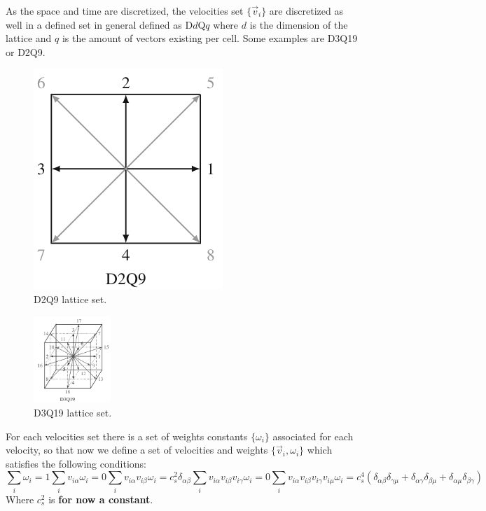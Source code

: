 As the space and time are discretized, the velocities set $\{\vec v_i\}$ are discretized as well in a defined set in general defined as D$d$Q$q$ where $d$ is the dimension of the lattice and $q$ is the amount of vectors existing per cell. Some examples are D3Q19 or D2Q9. 
\begin{figure}
\centering
\includegraphics[width=.25\textwidth]{images/LB/D2Q9.png}
\caption{\small D2Q9 lattice set.}
\end{figure}
 
\begin{figure}
\centering
\includegraphics[width=0.26\textwidth]{images/LB/D3Q19.png}
\caption{\small D3Q19 lattice set.}
\end{figure}

For each velocities set there is a set of weights constants $\{\omega_i\}$ associated for each velocity, so that now we define a set of velocities and weights $\{\vec v_i,\omega_i\}$ which satisfies the following conditions:
\begin{subequations}\label{eqs:sums_vw}
\begin{equation}\label{eq:sum_wi}
    \sum_i \omega_i = 1
\end{equation}
\begin{equation}\label{eq:sum_viwi}
    \sum_i v_{i\alpha}\omega_i = 0
\end{equation}
\begin{equation}\label{eq:sum_viviwi}
    \sum_i v_{i\alpha}v_{i\beta}\omega_i = c_s^2\delta_{\alpha\beta}
\end{equation}
\begin{equation}\label{eq:sum_viviviwi}
    \sum_i v_{i\alpha}v_{i\beta}v_{i\gamma}\omega_i = 0
\end{equation}
\begin{equation}\label{eq:sum_viviviviwi}
    \sum_i v_{i\alpha}v_{i\beta}v_{i\gamma}v_{i\mu}\omega_i = c_s^4(\delta_{\alpha\beta}\delta_{\gamma\mu} + \delta_{\alpha\gamma}\delta_{\beta\mu} + \delta_{\alpha\mu}\delta_{\beta\gamma})
\end{equation}
\end{subequations}
Where $c_s^2$ is \textbf{for now a constant}.


